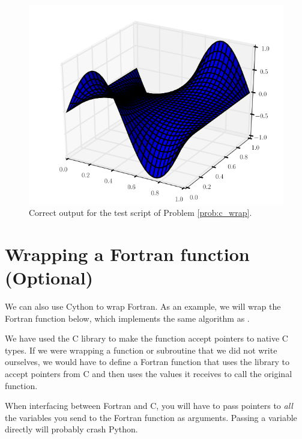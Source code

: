 \begin{problem}
\begin{figure}[H]
\includegraphics[width=\textwidth]{solution.png}
\caption{Correct output for the test script of Problem \ref{prob:c_wrap}.}
\label{fig:solution}
\end{figure}

\end{problem}

\section*{Wrapping a Fortran function (Optional)}
We can also use Cython to wrap Fortran.
As an example, we will wrap the Fortran function below, which implements the same algorithm as .

We have used the C library  to make the function accept pointers to native C types.
If we were wrapping a function or subroutine that we did not write ourselves, we would have to define a Fortran function that uses the  library to accept pointers from C and then uses the values it receives to call the original function.


\begin{warn}
When interfacing between Fortran and C, you will have to pass pointers to \emph{all} the variables you send to the Fortran function as arguments.
Passing a variable directly will probably crash Python.
\end{warn}

